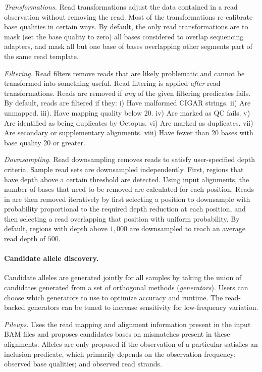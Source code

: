\documentclass[notitlepage, twocolumn, 10pt]{article}
\begin{document}
\vspace{3mm}
\noindent\emph{Transformations.} Read transformations adjust the data contained in a read observation without removing the read. Most of the transformations re-calibrate base qualities in certain ways. By default, the only read transformations are to mask (set the base quality to zero) all bases considered to overlap sequencing adapters, and mask all but one base of bases overlapping other segments part of the same read template.

\vspace{3mm}
\noindent\emph{Filtering.} Read filters remove reads that are likely problematic and cannot be transformed into something useful. Read filtering is applied \emph{after} read transformations. Reads are removed if \emph{any} of the given filtering predicates fails. By default, reads are filtered if they: i) Have malformed CIGAR strings. ii) Are unmapped. iii). Have mapping quality below 20. iv) Are marked as QC fails. v) Are identified as being duplicates by Octopus. vi) Are marked as duplicates. vii) Are secondary or supplementary alignments. viii) Have fewer than 20 bases with base quality 20 or greater.

\vspace{3mm}
\noindent\emph{Downsampling.} Read downsampling removes reads to satisfy user-specified depth criteria. Sample read sets are downsampled independently. First, regions that have depth above a certain threshold are detected. Using input alignments, the number of bases that need to be removed are calculated for each position. Reads in  are then removed iteratively by first selecting a position to downsample with probability proportional to the required depth reduction at each position, and then selecting a read overlapping that position with uniform probability. By default, regions with depth above $1,000$ are downsampled to reach an average read depth of $500$.

\paragraph*{Candidate allele discovery.} Candidate alleles are generated jointly for all samples by taking the union of candidates generated from a set of orthogonal methods (\emph{generators}). Users can choose which generators to use to optimize accuracy and runtime. The read-backed generators can be tuned to increase sensitivity for low-frequency variation.

\vspace{3mm}
\noindent\emph{Pileups.} Uses the read mapping and alignment information present in the input BAM files and proposes candidates bases on mismatches present in these alignments. Alleles are only proposed if the observation of a particular satisfies an inclusion predicate, which primarily depends on the observation frequency; observed base qualities; and observed read strands.
\end{document}
